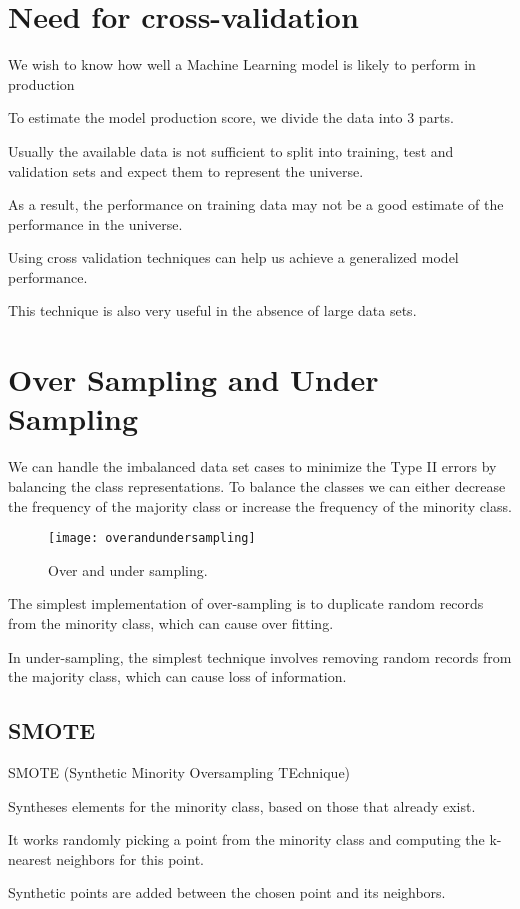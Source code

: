 	\section{Need for cross-validation}
	\begin{bulletedlist}
		\item We wish to know how well a Machine Learning model is likely to perform in production
		\item To estimate the model production score, we divide the data into 3 parts.
		\item Usually the available data is not sufficient to split into training, test and validation sets and expect them to represent the universe.
		\item As a result, the performance on training data may not be a good estimate of the performance in the universe.
		\item Using cross validation techniques can help us achieve a generalized model performance.
		\item This technique is also very useful in the absence of large data sets.
	\end{bulletedlist}

	\section{Over Sampling and Under Sampling}
We can handle the imbalanced data set cases to minimize the Type II errors by balancing the class representations.  To balance the classes we can either decrease the frequency of the majority class or increase the frequency of the minority class.
	\begin{figure}[h]
		\centering
		\texttt{[image: overandundersampling]}
		\caption{Over and under sampling.}
		\label{fig:overandundersampling}
	\end{figure}

The simplest implementation of over-sampling is to duplicate random records from the minority class, which can cause over fitting.

In under-sampling, the simplest technique involves removing random records from the majority class, which can cause loss of information.

	\subsection{SMOTE}
SMOTE (Synthetic Minority Oversampling TEchnique)
	\begin{bulletedlist}
		\item Syntheses elements for the minority class, based on those that already exist.
		\item It works randomly picking a point from the minority class and computing the k-nearest neighbors for this point.
		\item Synthetic points are added between the chosen point and its neighbors.
	\end{bulletedlist}